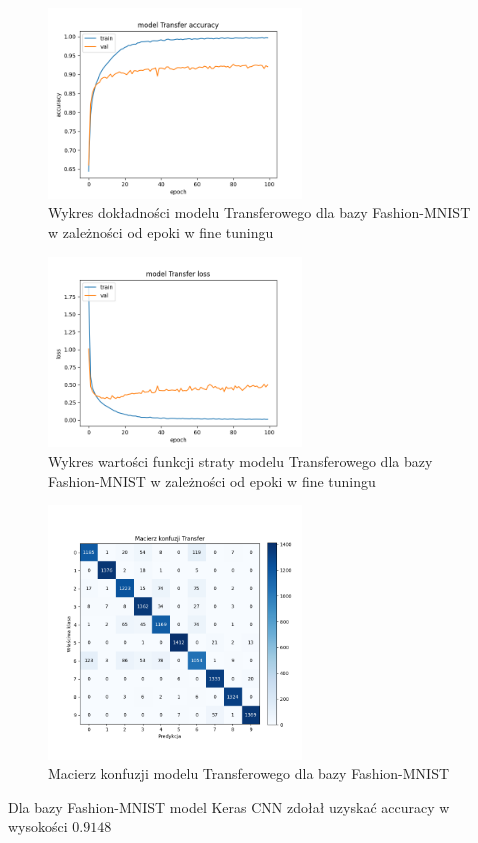 \documentclass{article}
\begin{document}
\begin{figure}[H]
    \centering
    \includegraphics[width=0.6\textwidth]{../Saves/Transfer/fashion-mnist/Transfer_fashion-mnist_ep100_acc.png}
    \caption{Wykres dokładności modelu Transferowego dla bazy Fashion-MNIST w zależności od epoki w fine tuningu}
\end{figure}

\begin{figure}[H]
    \centering
    \includegraphics[width=0.6\textwidth]{../Saves/Transfer/fashion-mnist/Transfer_fashion-mnist_ep100_loss.png}
    \caption{Wykres wartości funkcji straty modelu Transferowego dla bazy Fashion-MNIST w zależności od epoki w fine tuningu} 
\end{figure}

\begin{figure}[H]
	\centering
	\includegraphics[width=0.6\textwidth]{../Saves/Transfer/fashion-mnist/Transfer_fashion-mnist_conf_mat.png}
	\caption{Macierz konfuzji modelu Transferowego dla bazy Fashion-MNIST}
\end{figure}
Dla bazy Fashion-MNIST model Keras CNN zdołał uzyskać accuracy w wysokości $0.9148$
\end{document}
